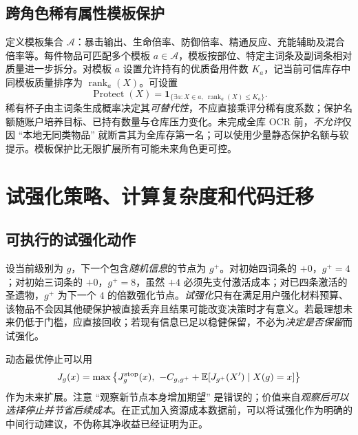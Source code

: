 \documentclass[11pt,a4paper]{ctexart}
\newcommand{\Ind}{\mathbf 1}
\newcommand{\E}{\mathbb E}
\begin{document}
\subsection{跨角色稀有属性模板保护}
定义模板集合 $\mathcal A$：暴击输出、生命倍率、防御倍率、精通反应、充能辅助及混合倍率等。每件物品可匹配多个模板 $a\in\mathcal A$，模板按部位、特定主词条及副词条相对质量进一步拆分。对模板 $a$ 设置允许持有的优质备用件数 $K_a$，记当前可信库存中同模板质量排序为 $\operatorname{rank}_a(X)$。可设置
\[
\operatorname{Protect}(X)=\Ind_{\{\exists a: X\in a,\ \operatorname{rank}_a(X)\le K_a\}}.
\]
稀有杯子由主词条生成概率决定其\emph{可替代性}，不应直接乘评分稀有度系数；保护名额随账户培养目标、已持有数量与仓库压力变化。未完成全库 OCR 前，\emph{不允许}仅因 ``本地无同类物品'' 就断言其为全库存第一名；可以使用少量静态保护名额与软提示。模板保护比无限扩展所有可能未来角色更可控。

\section{试强化策略、计算复杂度和代码迁移}
\subsection{可执行的试强化动作}
设当前级别为 $g$，下一个包含\emph{随机信息}的节点为 $g^+$。对初始四词条的 $+0$，$g^+=4$；对初始三词条的 $+0$，\textbf{$g^+=8$}，虽然 $+4$ 必须先支付激活成本；对已四条激活的圣遗物，$g^+$ 为下一个 $4$ 的倍数强化节点。\emph{试强化}只有在满足用户强化材料预算、该物品不会因其他硬保护被直接丢弃且结果可能改变决策时才有意义。若最理想未来仍低于门槛，应直接回收；若现有信息已足以稳健保留，不必为\emph{决定是否保留}而试强化。

动态最优停止可以用
\[
J_g(x)=\max\big\{J_g^{\rm stop}(x),\ -C_{g,g^+}+\E[J_{g^+}(X')\mid X(g)=x]\big\}
\]
作为未来扩展。注意 ``观察新节点本身增加期望'' 是错误的；价值来自\emph{观察后可以选择停止并节省后续成本}。在正式加入资源成本数据前，可以将试强化作为明确的中间行动建议，不伪称其净收益已经证明为正。
\end{document}
